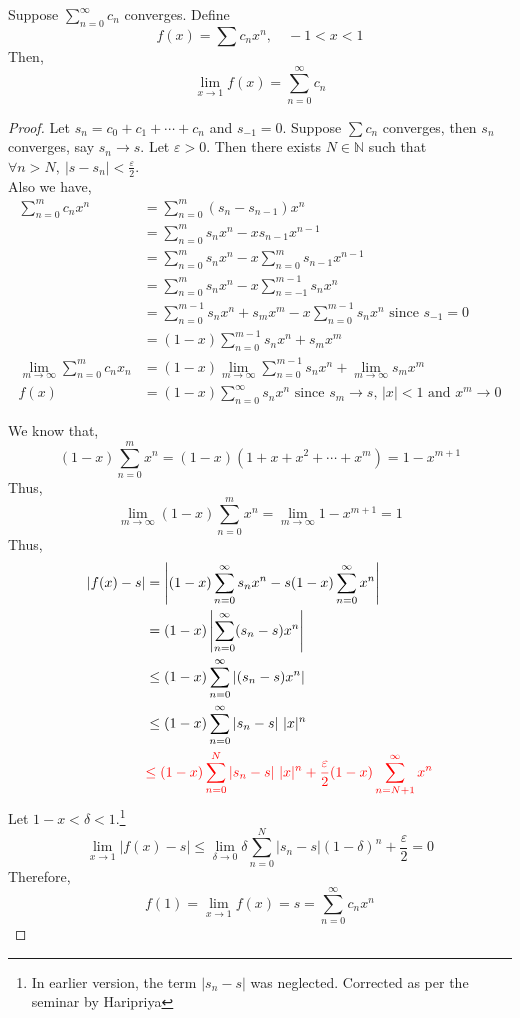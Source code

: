 \begin{theorem}
	Suppose $\displaystyle \sum_{n = 0}^\infty c_n$ converges.
	Define \[ f(x) = \sum c_n x^n,\quad -1<x<1 \]
	Then,
	\[ \lim_{x \to 1} f(x) = \sum_{n=0}^\infty c_n \]
\end{theorem}
\begin{proof}
	Let $s_n = c_0 + c_1 + \dotsb + c_n$ and $s_{-1} = 0$.
	Suppose $\sum c_n$ converges, then $s_n$ converges, say $s_n \to s$.
	Let $\varepsilon > 0$.
	Then there exists $N \in \mathbb{N}$ such that $\forall n > N,\ |s-s_n| < \frac{\varepsilon}{2}$.\\

	Also we have,
	\begin{align*}
		\sum_{n=0}^m c_n x^n
		& = \sum_{n=0}^m (s_n-s_{n-1})x^n \\
		& = \sum_{n=0}^m s_n x^n - xs_{n-1}x^{n-1} \\
		& = \sum_{n=0}^m s_nx^n - x\sum_{n=0}^{m}s_{n-1}x^{n-1} \\
		& = \sum_{n=0}^m s_nx^n - x\sum_{n=-1}^{m-1}s_nx^n \\
		& = \sum_{n=0}^{m-1} s_nx^n + s_mx^m - x\sum_{n=0}^{m-1}s_nx^n \text{ since $s_{-1} = 0$} \\
		& = (1-x)\sum_{n=0}^{m-1} s_nx^n + s_mx^m \\
		\lim_{m \to \infty} \sum_{n=0}^m c_n x_n
		& = (1-x) \lim_{m \to \infty} \sum_{n=0}^{m-1} s_nx^n + \lim_{m \to \infty} s_m x^m  \\
		f(x) & = (1-x) \sum_{n=0}^\infty s_nx^n \text{ since $s_m \to s$, $|x|<1$ and $x^m \to 0$}
	\end{align*}

	{\color{red}
	We know that,
	\[ (1-x)\sum_{n=0}^m x^n = (1-x)(1+x+x^2+\dotsb+x^m) = 1-x^{m+1} \]
	Thus,
	\[ \lim_{m \to \infty} (1-x)\sum_{n=0}^m x^n = \lim_{m \to \infty} 1-x^{m+1} = 1 \]
	}
	Thus,
	\begin{align*}
		|f(x) - s| 
		& = \left| (1-x)\sum_{n=0}^\infty s_nx^n - s(1-x)\sum_{n=0}^\infty x^n \right| \\
		& = (1-x) \left| \sum_{n=0}^\infty (s_n-s)x^n \right| \\
		& \le (1-x) \sum_{n=0}^\infty |(s_n-s)x^n| \\
		& \le (1-x)\sum_{n=0}^\infty |s_n-s|\ |x|^n  \\
		& {\color{red}\le (1-x)\sum_{n=0}^N |s_n-s|\ |x|^n +  \frac{\varepsilon}{2} (1-x) \sum_{n=N+1}^\infty x^n} \\
	\end{align*}
	{ \color{red}
	Let $1-x < \delta < 1$.\dag\footnote{
		In earlier version, the term $|s_n-s|$ was neglected.
		Corrected as per the seminar by Haripriya}
	\[ \lim_{x \to 1} |f(x) - s| \le \lim_{\delta \to 0} \delta \sum_{n=0}^N |s_n -s| (1-\delta)^n + \frac{\varepsilon}{2} = 0 \]
	}	
	Therefore, 
	\[ f(1) = \lim_{x \to 1} f(x) = s = \sum_{n = 0}^\infty c_nx^n \]
\end{proof}

